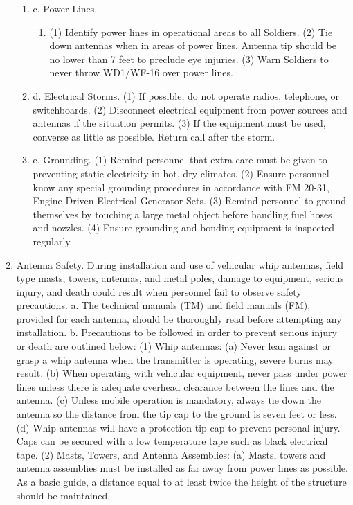 \documentclass{article}
\begin{document}
\begin{enumerate}
\begin{enumerate}
	\item c.	Power Lines.
	\begin{enumerate}
\item (1)	Identify power lines in operational areas to all Soldiers.
(2)	Tie down antennas when in areas of power lines. Antenna tip should be no lower than 7 feet to preclude eye injuries.
(3)	Warn Soldiers to never throw WD1/WF-16 over power lines.
\end{enumerate}
	\item d.	Electrical Storms.
(1)	If possible, do not operate radios, telephone, or switchboards.
(2)	Disconnect electrical equipment from power sources and antennas if the situation 				permits.
(3)	If the equipment must be used, converse as little as possible.  Return call after the 				storm.
\item	e.	Grounding.
(1)	Remind personnel that extra care must be given to preventing static electricity in hot, dry climates.
(2)	Ensure personnel know any special grounding procedures in accordance with FM 20-31,
	 Engine-Driven Electrical Generator Sets.
(3)	Remind personnel to ground themselves by touching a large metal object before handling fuel hoses and nozzles.
(4)	Ensure grounding and bonding equipment is inspected regularly.
\end{enumerate}
\item  Antenna Safety. During installation and use of vehicular whip antennas, field type masts, towers, antennas, and metal poles, damage to equipment, serious injury, and death could result when personnel fail to observe safety precautions. 
	a.	The technical manuals (TM) and field manuals (FM), provided for each antenna, should be thoroughly read before attempting any installation.
	b.	Precautions to be followed in order to prevent serious injury or death are outlined below:
	(1) Whip antennas:
(a)	Never lean against or grasp a whip antenna when the transmitter is operating, severe burns may result.
(b)	When operating with vehicular equipment, never pass under power lines unless there is adequate overhead clearance between the lines and the antenna.
(c)	Unless mobile operation is mandatory, always tie down the antenna so the distance from the tip cap to the ground is seven feet or less.
(d)	Whip antennas will have a protection tip cap to prevent personal injury. Caps can be secured with a low temperature tape such as black electrical tape.
(2)	Masts, Towers, and Antenna Assemblies:
(a)	Masts, towers and antenna assemblies must be installed as far away from power lines as possible. As a basic guide, a distance equal to at least twice the height of the structure should be maintained.

\end{enumerate}
\end{document}
